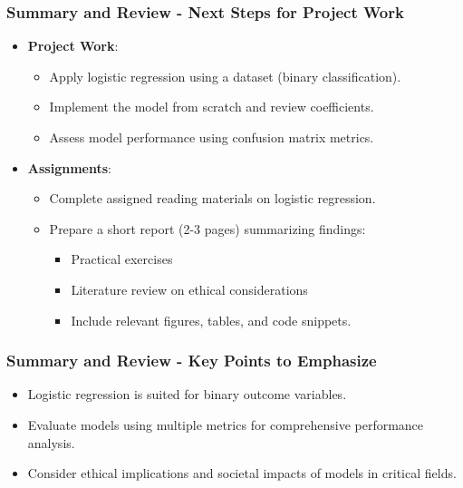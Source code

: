 \documentclass[aspectratio=169]{beamer}
\begin{document}
\begin{frame}[fragile]
    \frametitle{Summary and Review - Next Steps for Project Work}
    
    \begin{itemize}
        \item \textbf{Project Work}:
        \begin{itemize}
            \item Apply logistic regression using a dataset (binary classification).
            \item Implement the model from scratch and review coefficients.
            \item Assess model performance using confusion matrix metrics.
        \end{itemize}
        
        \item \textbf{Assignments}:
        \begin{itemize}
            \item Complete assigned reading materials on logistic regression.
            \item Prepare a short report (2-3 pages) summarizing findings:
            \begin{itemize}
                \item Practical exercises
                \item Literature review on ethical considerations
                \item Include relevant figures, tables, and code snippets.
            \end{itemize}
        \end{itemize}
    \end{itemize}
\end{frame}

\begin{frame}[fragile]
    \frametitle{Summary and Review - Key Points to Emphasize}
    
    \begin{itemize}
        \item Logistic regression is suited for binary outcome variables.
        \item Evaluate models using multiple metrics for comprehensive performance analysis.
        \item Consider ethical implications and societal impacts of models in critical fields.
    \end{itemize}
\end{frame}
\end{document}

